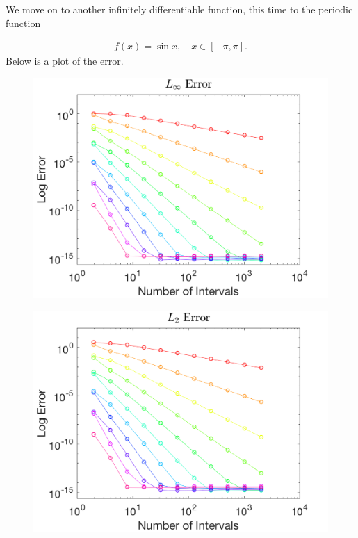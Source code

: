 \documentclass{article}
\begin{document}
\noindent We move on to another infinitely differentiable function, this time to the periodic function

  \begin{align*}
    f(x) = \sin x , \quad x \in \left[ -\pi, \pi\right].
  \end{align*}
Below is a plot of the error.

\begin{figure}[H]
  \centering
  \begin{minipage}{.6\textwidth}
    \centering
    \includegraphics[width=\linewidth]{maxError_2.png}
    \label{fig:max0}
  \end{minipage}%
  \begin{minipage}{.6\textwidth}
    \centering
    \includegraphics[width=\linewidth]{squareError_2.png}
    \label{fig:max0}
  \end{minipage}%
\end{figure}
\end{document}
